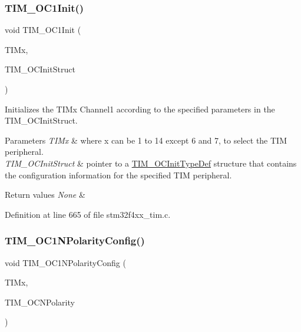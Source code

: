 \mbox{\label{group___t_i_m_gafcdb6ff00158862aef7fed5e7a554a3e}} 
\subsubsection{\texorpdfstring{T\+I\+M\+\_\+\+O\+C1\+Init()}{TIM\_OC1Init()}}
{\footnotesize\ttfamily void T\+I\+M\+\_\+\+O\+C1\+Init (\begin{DoxyParamCaption}\item[{\hyperlink{struct_t_i_m___type_def}{T\+I\+M\+\_\+\+Type\+Def} $\ast$}]{T\+I\+Mx,  }\item[{\hyperlink{struct_t_i_m___o_c_init_type_def}{T\+I\+M\+\_\+\+O\+C\+Init\+Type\+Def} $\ast$}]{T\+I\+M\+\_\+\+O\+C\+Init\+Struct }\end{DoxyParamCaption})}



Initializes the T\+I\+Mx Channel1 according to the specified parameters in the T\+I\+M\+\_\+\+O\+C\+Init\+Struct. 


\begin{DoxyParams}{Parameters}
{\em T\+I\+Mx} & where x can be 1 to 14 except 6 and 7, to select the T\+IM peripheral. \\
\hline
{\em T\+I\+M\+\_\+\+O\+C\+Init\+Struct} & pointer to a \hyperlink{struct_t_i_m___o_c_init_type_def}{T\+I\+M\+\_\+\+O\+C\+Init\+Type\+Def} structure that contains the configuration information for the specified T\+IM peripheral. \\
\hline
\end{DoxyParams}

\begin{DoxyRetVals}{Return values}
{\em None} & \\
\hline
\end{DoxyRetVals}


Definition at line 665 of file stm32f4xx\+\_\+tim.\+c.

\mbox{\label{group___t_i_m_ga3cb91578e7dd34ea7d09862482960445}} 
\subsubsection{\texorpdfstring{T\+I\+M\+\_\+\+O\+C1\+N\+Polarity\+Config()}{TIM\_OC1NPolarityConfig()}}
{\footnotesize\ttfamily void T\+I\+M\+\_\+\+O\+C1\+N\+Polarity\+Config (\begin{DoxyParamCaption}\item[{\hyperlink{struct_t_i_m___type_def}{T\+I\+M\+\_\+\+Type\+Def} $\ast$}]{T\+I\+Mx,  }\item[{uint16\+\_\+t}]{T\+I\+M\+\_\+\+O\+C\+N\+Polarity }\end{DoxyParamCaption})}



